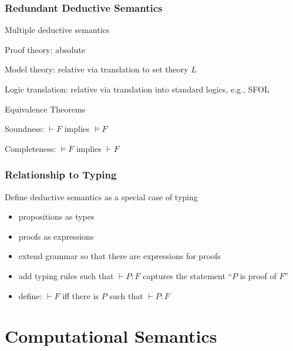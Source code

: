 \begin{frame}\frametitle{Redundant Deductive Semantics}
\begin{blockitems}{Multiple deductive semantics}
\item Proof theory: absolute
\item Model theory: relative via translation to set theory $L$
\item Logic translation: relative via translation into standard logics, e.g., SFOL
\end{blockitems}

\begin{blockitems}{Equivalence Theorems}
\item Soundness: $\vdash F$ implies $\models F$
\item Completeness: $\models F$ implies $\vdash F$
\end{blockitems}
\end{frame}

\begin{frame}\frametitle{Relationship to Typing}
Define deductive semantics as a special case of typing
\begin{itemize}
\item propositions as types
\item proofs as expressions
\item extend grammar so that there are expressions for proofs
\item add typing rules such that $\vdash P:F$ captures the statement ``$P$ is proof of $F$''
\item define: $\vdash F$ iff there is $P$ such that $\vdash P:F$
\end{itemize}
\end{frame}

\section{Computational Semantics}

